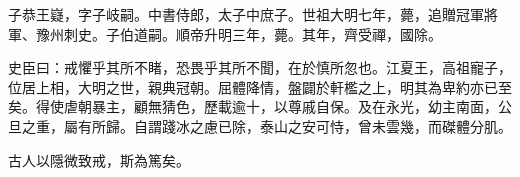 \begin{pinyinscope}
 子恭王嶷，字子岐嗣。中書侍郎，太子中庶子。世祖大明七年，薨，追贈冠軍將軍、豫州刺史。子伯道嗣。順帝升明三年，薨。其年，齊受禪，國除。



 史臣曰：戒懼乎其所不睹，恐畏乎其所不聞，在於慎所忽也。江夏王，高祖寵子，位居上相，大明之世，親典冠朝。屈體降情，盤闢於軒檻之上，明其為卑約亦已至矣。得使虐朝暴主，顧無猜色，歷載逾十，以尊戚自保。及在永光，幼主南面，公旦之重，屬有所歸。自謂踐冰之慮已除，泰山之安可恃，曾未雲幾，而磔體分肌。



 古人以隱微致戒，斯為篤矣。



\end{pinyinscope}